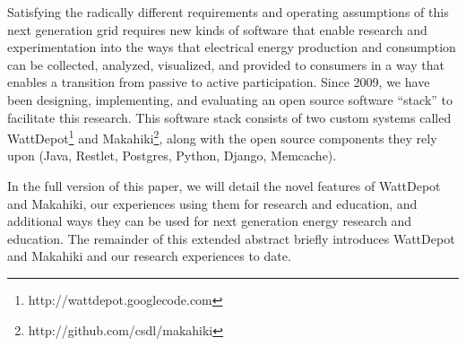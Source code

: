 Satisfying the radically different requirements and operating assumptions of this next generation grid requires new kinds of software that enable research and experimentation into the ways that electrical energy production and consumption can be collected, analyzed, visualized, and provided to consumers in a way that enables a transition from passive to active participation.  Since 2009, we have been designing, implementing, and evaluating an open source software ``stack'' to facilitate this research.  This software stack consists of two custom systems called WattDepot\footnote{http://wattdepot.googlecode.com} and Makahiki\footnote{http://github.com/csdl/makahiki}, along with the open source components they rely upon (Java, Restlet, Postgres, Python, Django, Memcache).

In the full version of this paper, we will detail the novel features of WattDepot and Makahiki, our experiences using them for research and education, and additional ways they can be used for next generation energy research and education.  The remainder of this extended abstract briefly introduces WattDepot and Makahiki and our research experiences to date.
